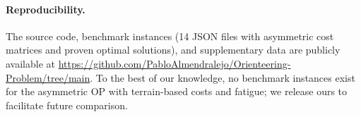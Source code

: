 \documentclass[preprint,11pt]{elsarticle}
\begin{document}
\paragraph{Reproducibility.}
The source code, benchmark instances (14 JSON files with asymmetric cost matrices and proven optimal solutions), and supplementary data are publicly available at \url{https://github.com/PabloAlmendralejo/Orienteering-Problem/tree/main}.
To the best of our knowledge, no benchmark instances exist for the asymmetric OP with terrain-based costs and fatigue; we release ours to facilitate future comparison.



\end{document}
